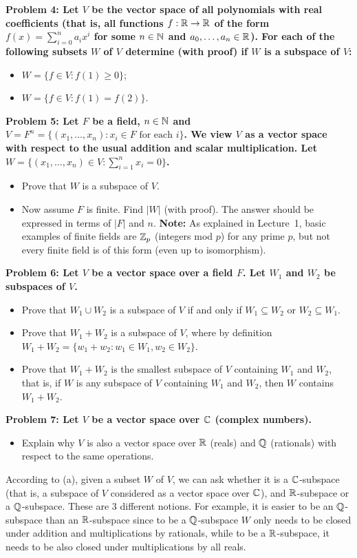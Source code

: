 \documentclass[11pt]{amsart}
\begin{document}
\bf{Problem 4: }\rm Let $V$ be the vector space of all polynomials with real coefficients (that is, all functions $f:{\mathbb R}\to{\mathbb R}$
of the form $f(x)=\sum\limits_{i=0}^n a_i x^i$ for some $n\in{\mathbb N}$ and $a_0,\ldots, a_n\in{\mathbb R}$). For each of the following
subsets $W$ of $V$ determine (with proof) if $W$ is a subspace of $V$:
\begin{itemize}
\item[(a)] $W=\{f\in V: f(1)\geq 0 \}$;
\item[(b)] $W=\{f\in V: f(1)=f(2) \}$.
\end{itemize}
\skv
\bf{Problem 5: }\rm Let $F$ be a field, $n\in{\mathbb N}$ and $V=F^n=\{(x_1,\ldots, x_n): x_i\in F\mbox{ for each }i\}$. We view $V$ as a vector space with respect to the usual addition and scalar multiplication. Let $W=\{(x_1,\ldots,x_n)\in V: \sum\limits_{i=1}^n x_i=0\}$.
\begin{itemize}
\item[(a)] Prove that $W$ is a subspace of $V$.
\item[(b)] Now assume $F$ is finite. Find $|W|$ (with proof). The answer should be expressed in terms of $|F|$ and $n$. {\bf Note:}
As explained in Lecture~1, basic examples of finite fields are ${\mathbb Z}_p$ (integers mod $p$) for any prime $p$, but not every finite field
is of this form (even up to isomorphism).  
\end{itemize}
\skv
\bf{Problem 6: }\rm Let $V$ be a vector space over a field $F$. Let
$W_1$ and $W_2$ be subspaces of $V$.
\begin{itemize}
\item[(a)] Prove that $W_1\cup W_2$ is a subspace of $V$ if and only if $W_1\subseteq W_2$
or $W_2\subseteq W_1$.
\item[(b)] Prove that $W_1+W_2$ is a subspace of $V$, where by definition 
$W_1+W_2=\{w_1+w_2: w_1\in W_1, w_2\in W_2\}$. 
\item[(c)] Prove that $W_1+W_2$ is the smallest subspace of $V$ containing $W_1$ and $W_2$,
that is, if $W$ is any subspace of $V$ containing $W_1$ and $W_2$, then $W$ contains $W_1+W_2$.
\end{itemize}
\skv
\bf{Problem 7: }\rm Let $V$ be a vector space over ${\mathbb C}$ (complex numbers).
\begin{itemize}
\item[(a)] Explain why $V$ is also a vector space over ${\mathbb R}$ (reals) and ${\mathbb Q}$ (rationals) with respect to the same operations.
\end{itemize} 
According to (a), given a subset $W$ of $V$, we can ask whether it is a ${\mathbb C}$-subspace (that is, a subspace of $V$
considered as a vector space over ${\mathbb C}$), and ${\mathbb R}$-subspace or a ${\mathbb Q}$-subspace. These are 3 different notions.
For example, it is easier to be an ${\mathbb Q}$-subspace than an ${\mathbb R}$-subspace since to be a ${\mathbb Q}$-subspace $W$
only needs to be closed under addition and multiplications by rationals, while to be a ${\mathbb R}$-subspace, it needs
to be also closed under multiplications by all reals.
\end{document}
